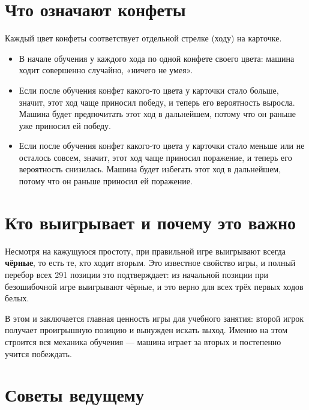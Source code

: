 \documentclass[12pt,a4paper]{article}
\begin{document}
\section*{Что означают конфеты}

Каждый цвет конфеты соответствует отдельной стрелке (ходу) на карточке.

\begin{itemize}[nosep]
\item В начале обучения у каждого хода по одной конфете своего цвета:
      машина ходит совершенно случайно, «ничего не умея».
\item Если после обучения конфет какого-то цвета у карточки стало больше, значит, этот ход чаще приносил победу,
      и теперь его вероятность выросла.
      Машина будет предпочитать этот ход в дальнейшем, потому что он раньше уже приносил ей победу.
\item Если после обучения конфет какого-то цвета у карточки стало меньше или не осталось совсем,
      значит, этот ход чаще приносил поражение, и теперь его вероятность снизилась.
      Машина будет избегать этот ход в дальнейшем, потому что он раньше приносил ей поражение.
\end{itemize}


\section*{Кто выигрывает и почему это важно}

Несмотря на кажущуюся простоту, при правильной игре выигрывают всегда \textbf{чёрные}, то есть те, кто ходит вторым.
Это известное свойство игры, и полный перебор всех 291 позиции это подтверждает:
из начальной позиции при безошибочной игре выигрывают чёрные, и это верно для всех трёх первых ходов белых.

В этом и заключается главная ценность игры для учебного занятия:
второй игрок получает проигрышную позицию и вынужден искать выход.
Именно на этом строится вся механика обучения --- машина играет за вторых и постепенно учится побеждать.


\section*{Советы ведущему}
\end{document}

